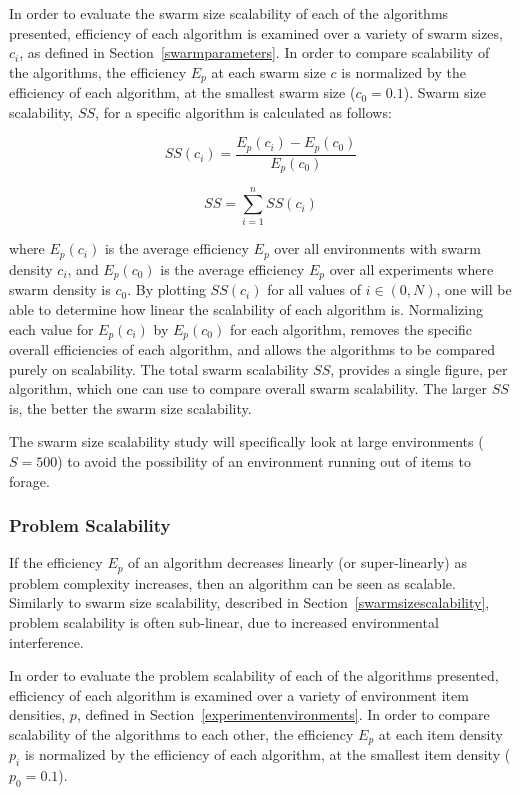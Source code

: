 In order to evaluate the swarm size scalability of each of the algorithms presented, efficiency of each algorithm is examined over a variety of swarm sizes, $c_i$, as defined in Section~\ref{swarmparameters}. In order to compare scalability of the algorithms, the efficiency $E_p$ at each swarm size $c$ is normalized by the efficiency of each algorithm, at the smallest swarm size ($c_0=0.1$). Swarm size scalability, $SS$, for a specific algorithm is calculated as follows:

\begin{equation}
	SS(c_i) = \dfrac{E_p(c_i)-E_p(c_0)}{E_p(c_0)}
\end{equation}

\begin{equation}
	SS = \sum_{i=1}^{n} SS(c_i)
\end{equation}

where $E_p(c_i)$ is the average efficiency $E_p$ over all environments with swarm density $c_i$, and $E_p(c_0)$ is the average efficiency $E_p$ over all experiments where swarm density is $c_0$. By plotting $SS(c_i)$ for all values of $i\in(0,N)$, one will be able to determine how linear the scalability of each algorithm is. Normalizing each value for $E_p(c_i)$ by $E_p(c_0)$ for each algorithm, removes the specific overall efficiencies of each algorithm, and allows the algorithms to be compared purely on scalability. The total swarm scalability $SS$, provides a single figure, per algorithm, which one can use to compare overall swarm scalability. The larger $SS$ is, the better the swarm size scalability. 

The swarm size scalability study will specifically look at large environments ($S=500$) to avoid the possibility of an environment running out of items to forage.


\subsubsection{Problem Scalability}
\label{setup:problemscalability}
If the efficiency $E_p$ of an algorithm decreases linearly (or super-linearly) as problem complexity increases, then an algorithm can be seen as scalable. Similarly to swarm size scalability, described in Section~\ref{swarmsizescalability}, problem scalability is often sub-linear, due to increased environmental interference.

In order to evaluate the problem scalability of each of the algorithms presented, efficiency of each algorithm is examined over a variety of environment item densities, $p$, defined in Section~\ref{experimentenvironments}. In order to compare scalability of the algorithms to each other, the efficiency $E_p$ at each item density $p_i$ is normalized by the efficiency of each algorithm, at the smallest item density ($p_0=0.1$). 

